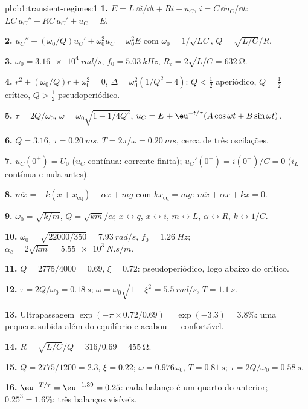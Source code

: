 \begin{solution}{pb:b1:transient-regimes:1}
\textbf{1.} $E = L\,\dd i/\dd t + Ri + u_C$, $i = C\,\dd u_C/\dd t$:
$LC\,u_C'' + RC\,u_C' + u_C = E$.

\textbf{2.} $u_C'' + (\omega_0/Q)u_C' + \omega_0^2u_C = \omega_0^2E$ com
$\omega_0 = 1/\sqrt{LC}$, $Q = \sqrt{L/C}/R$.

\textbf{3.} $\omega_0 = \qty{3.16e4}{rad/s}$, $f_0 = \qty{5.03}{kHz}$,
$R_c = 2\sqrt{L/C} = \qty{632}{\ohm}$.

\textbf{4.} $r^2 + (\omega_0/Q)r + \omega_0^2 = 0$, $\Delta = \omega_0^2(1/Q^2
- 4)$: $Q < \tfrac12$ aperiódico, $Q = \tfrac12$ crítico, $Q > \tfrac12$
pseudoperiódico.

\textbf{5.} $\tau = 2Q/\omega_0$, $\omega = \omega_0\sqrt{1 - 1/4Q^2}$,
$u_C = E + \eu^{-t/\tau}(A\cos\omega t + B\sin\omega t)$.

\textbf{6.} $Q = 3.16$, $\tau = \qty{0.20}{ms}$, $T = 2\pi/\omega =
\qty{0.20}{ms}$, cerca de três oscilações.

\textbf{7.} $u_C(0^+) = U_0$ ($u_C$ contínua: corrente finita);
$u_C'(0^+) = i(0^+)/C = 0$ ($i_L$ contínua e nula antes).

\textbf{8.} $m\ddot x = -k(x + x_{\text{eq}}) - \alpha\dot x + mg$ com
$kx_{\text{eq}} = mg$: $m\ddot x + \alpha\dot x + kx = 0$.

\textbf{9.} $\omega_0 = \sqrt{k/m}$, $Q = \sqrt{km}/\alpha$; $x \leftrightarrow
q$, $\dot x \leftrightarrow i$, $m \leftrightarrow L$, $\alpha \leftrightarrow
R$, $k \leftrightarrow 1/C$.

\textbf{10.} $\omega_0 = \sqrt{22000/350} = \qty{7.93}{rad/s}$, $f_0 =
\qty{1.26}{Hz}$; $\alpha_c = 2\sqrt{km} = \qty{5.55e3}{N.s/m}$.

\textbf{11.} $Q = 2775/4000 = 0.69$, $\xi = 0.72$: pseudoperiódico, logo
abaixo do crítico.

\textbf{12.} $\tau = 2Q/\omega_0 = \qty{0.18}{s}$; $\omega = \omega_0\sqrt{1
- \xi^2} = \qty{5.5}{rad/s}$, $T = \qty{1.1}{s}$.

\textbf{13.} Ultrapassagem $\exp(-\pi \times 0.72/0.69) = \exp(-3.3) = 3.8\%$:
uma pequena subida além do equilíbrio e acabou --- confortável.

\textbf{14.} $R = \sqrt{L/C}/Q = 316/0.69 = \qty{455}{\ohm}$.

\textbf{15.} $Q = 2775/1200 = 2.3$, $\xi = 0.22$; $\omega = 0.976\omega_0$,
$T = \qty{0.81}{s}$; $\tau = 2Q/\omega_0 = \qty{0.58}{s}$.

\textbf{16.} $\eu^{-T/\tau} = \eu^{-1.39} = 0.25$: cada balanço é um
quarto do anterior; $0.25^3 = 1.6\%$: três balanços visíveis.


\end{solution}
